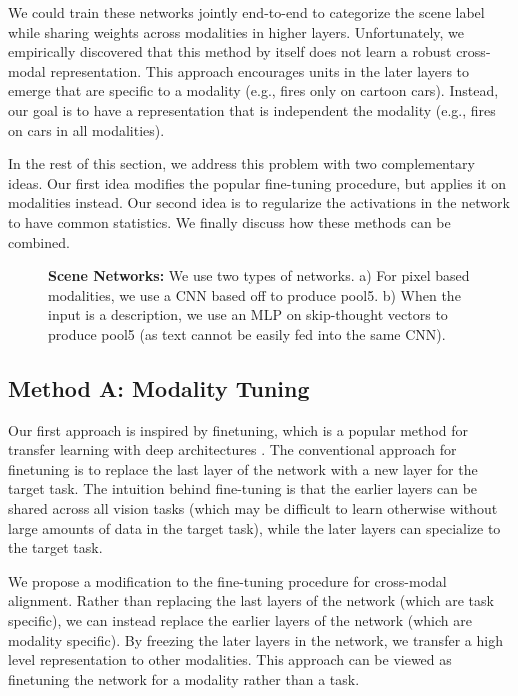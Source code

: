 \documentclass[10pt,journal,compsoc]{IEEEtran}
\begin{document}
    We could train these networks jointly end-to-end to categorize the scene label while sharing weights across modalities in higher layers. Unfortunately, we empirically discovered that this method by itself does not learn a robust cross-modal representation. This approach encourages units in the later layers to emerge that are specific to a modality (e.g., fires only on cartoon cars). Instead, our goal is to have a representation that is independent the modality (e.g., fires on cars in all modalities). 
    
    In the rest of this section, we address this problem with two complementary ideas. Our first idea modifies the popular fine-tuning procedure, but applies it on modalities instead. Our second idea is to regularize the activations in the network to have common statistics. We finally discuss how these methods can be combined. 


    \begin{figure}[t]
        \centering
        \caption{\textbf{Scene Networks:} We use two types of networks. a) For pixel based modalities, we use a CNN based off \cite{zhou2014learning} to produce pool5. b) When the input is a description, we use an MLP on skip-thought vectors \cite{kiros2015skip} to produce pool5 (as text cannot be easily fed into the same CNN).}
        \label{fig:network}
    \end{figure}

    
    \subsection{Method A: Modality Tuning}
    
    Our first approach is inspired by finetuning, which is a popular method for transfer learning with deep architectures \cite{donahue2013decaf,girshick2014rcnn,zhou2014learning}. The conventional approach for finetuning is to replace the last layer of the network with a new layer for the target task. The intuition behind fine-tuning is that the earlier layers can be shared across all vision tasks (which may be difficult to learn otherwise without large amounts of data in the target task), while the later layers can specialize to the target task. 
    
    We propose a modification to the fine-tuning procedure for cross-modal alignment. Rather than replacing the last layers of the network (which are task specific), we can instead replace the earlier layers of the network (which are modality specific). By freezing the later layers in the network, we transfer a high level representation to other modalities. This approach can be viewed as finetuning the network for a modality rather than a task.
    
\end{document}
